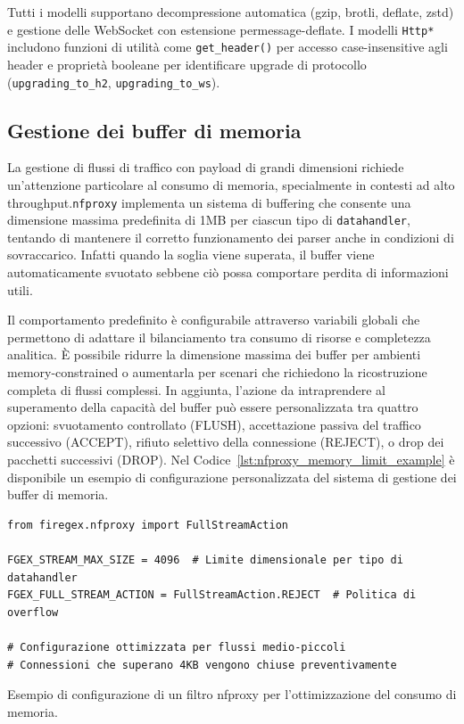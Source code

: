 Tutti i modelli supportano decompressione automatica (gzip, brotli, deflate, zstd) e gestione delle WebSocket con estensione permessage-deflate. I modelli \texttt{Http*} includono funzioni di utilità come \texttt{get\_header()} per accesso case-insensitive agli header e proprietà booleane per identificare upgrade di protocollo (\texttt{upgrading\_to\_h2}, \texttt{upgrading\_to\_ws}).

\subsection{Gestione dei buffer di memoria}

La gestione di flussi di traffico con payload di grandi dimensioni richiede un'attenzione particolare al consumo di memoria, specialmente in contesti ad alto throughput.\@ \texttt{\gls{nfproxy}} implementa un sistema di buffering che consente una dimensione massima predefinita di 1MB per ciascun tipo di \texttt{datahandler}, tentando di mantenere il corretto funzionamento dei parser anche in condizioni di sovraccarico. Infatti quando la soglia viene superata, il buffer viene automaticamente svuotato sebbene ciò possa comportare perdita di informazioni utili.

Il comportamento predefinito è configurabile attraverso variabili globali che permettono di adattare il bilanciamento tra consumo di risorse e completezza analitica. È possibile ridurre la dimensione massima dei buffer per ambienti memory-constrained o aumentarla per scenari che richiedono la ricostruzione completa di flussi complessi. In aggiunta, l'azione da intraprendere al superamento della capacità del buffer può essere personalizzata tra quattro opzioni: svuotamento controllato (FLUSH), accettazione passiva del traffico successivo (ACCEPT), rifiuto selettivo della connessione (REJECT), o drop dei pacchetti successivi (DROP). Nel Codice~\ref{lst:nfproxy_memory_limit_example} è disponibile un esempio di configurazione personalizzata del sistema di gestione dei buffer di memoria.

\begin{listing}[H]
\begin{verbatim}
from firegex.nfproxy import FullStreamAction

FGEX_STREAM_MAX_SIZE = 4096  # Limite dimensionale per tipo di datahandler
FGEX_FULL_STREAM_ACTION = FullStreamAction.REJECT  # Politica di overflow

# Configurazione ottimizzata per flussi medio-piccoli
# Connessioni che superano 4KB vengono chiuse preventivamente
\end{verbatim}
\vspace{-1em}
\caption{Esempio di configurazione di un filtro nfproxy per l'ottimizzazione del consumo di memoria.}\label{lst:nfproxy_memory_limit_example}
\end{listing}

